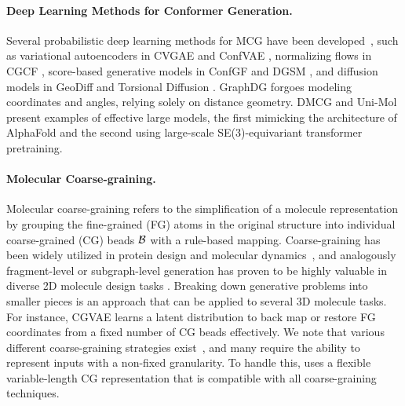 \paragraph{Deep Learning Methods for Conformer Generation.} Several probabilistic deep learning methods for MCG have been developed~\citep{generative_background}, such as variational autoencoders in CVGAE \citep{CVGAE} and ConfVAE \citep{ConfVAE}, normalizing flows in CGCF \citep{CGCF}, score-based generative models in ConfGF \citep{ConfGF} and DGSM \citep{DGSM}, and diffusion models in GeoDiff \citep{geodiff} and Torsional Diffusion \citep{torsional-diffusion}. GraphDG \citep{GraphDG} forgoes modeling coordinates and angles, relying solely on distance geometry. DMCG \citep{DMCG} and Uni-Mol \citep{unimol} present examples of effective large models, the first mimicking the architecture of AlphaFold \citep{alphafold} and the second using large-scale SE(3)-equivariant transformer pretraining. 


\vspace{-1ex}
\paragraph{Molecular Coarse-graining.} Molecular coarse-graining refers to the simplification of a molecule representation by grouping the fine-grained (FG) atoms in the original structure into individual coarse-grained (CG) beads ${\mathcal{B}}$ with a rule-based mapping.
Coarse-graining has been widely utilized in protein design \citep{CGProt-background, CGProtein} and molecular dynamics~\citep{cg-force-field}, and analogously fragment-level or subgraph-level generation has proven to be highly valuable in diverse 2D molecule design tasks \citep{FaST}.
Breaking down generative problems into smaller pieces is an approach that can be applied to several 3D molecule tasks. For instance, CGVAE \citep{CGVAE} learns a latent distribution to back map or restore FG coordinates from a fixed number of CG beads effectively.
We note that various different coarse-graining strategies exist~\citep{cg-survey, arts2023diffusion, CG-MD, cg_thermo}, and many require the ability to represent inputs with a non-fixed granularity. 
To handle this, \model uses a flexible variable-length CG representation that is compatible with all coarse-graining techniques.


